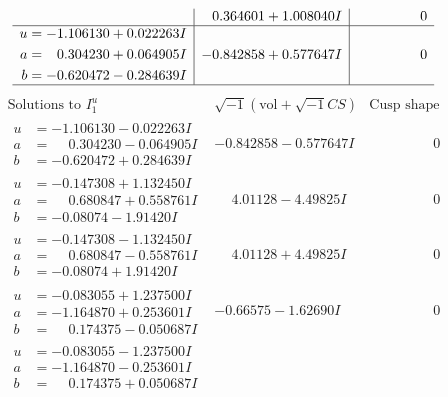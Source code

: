 \documentclass[1p]{elsarticle_modified}
\theoremstyle{definition}
\newcommand{\I}{\sqrt{-1}}
\begin{document}
$$\begin{array}{c|c|c}
 & \phantom{-}0.364601 + 1.008040 I & \phantom{-0.000000 } 0 \\ \hline\begin{aligned}
u &= -1.106130 + 0.022263 I \\
a &= \phantom{-}0.304230 + 0.064905 I \\
b &= -0.620472 - 0.284639 I\end{aligned}
 & -0.842858 + 0.577647 I & \phantom{-0.000000 } 0\\
 \hline 
 \end{array}$$\newpage$$\begin{array}{c|c|c}  
\text{Solutions to }I^u_{1}& \I (\text{vol} + \sqrt{-1}CS) & \text{Cusp shape}\\
 \hline 
\begin{aligned}
u &= -1.106130 - 0.022263 I \\
a &= \phantom{-}0.304230 - 0.064905 I \\
b &= -0.620472 + 0.284639 I\end{aligned}
 & -0.842858 - 0.577647 I & \phantom{-0.000000 } 0 \\ \hline\begin{aligned}
u &= -0.147308 + 1.132450 I \\
a &= \phantom{-}0.680847 + 0.558761 I \\
b &= -0.08074 - 1.91420 I\end{aligned}
 & \phantom{-}4.01128 - 4.49825 I & \phantom{-0.000000 } 0 \\ \hline\begin{aligned}
u &= -0.147308 - 1.132450 I \\
a &= \phantom{-}0.680847 - 0.558761 I \\
b &= -0.08074 + 1.91420 I\end{aligned}
 & \phantom{-}4.01128 + 4.49825 I & \phantom{-0.000000 } 0 \\ \hline\begin{aligned}
u &= -0.083055 + 1.237500 I \\
a &= -1.164870 + 0.253601 I \\
b &= \phantom{-}0.174375 - 0.050687 I\end{aligned}
 & -0.66575 - 1.62690 I & \phantom{-0.000000 } 0 \\ \hline\begin{aligned}
u &= -0.083055 - 1.237500 I \\
a &= -1.164870 - 0.253601 I \\
b &= \phantom{-}0.174375 + 0.050687 I\end{aligned}

\end{array}$$
\end{document}
